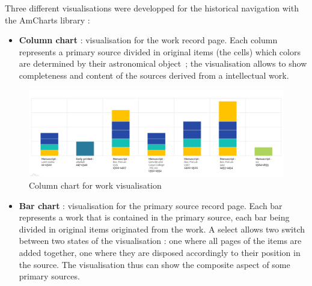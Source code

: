 \documentclass[a4paper,12pt,twoside]{book}
\begin{document}
Three different visualisations were developped for the historical navigation with the AmCharts library :
\begin{itemize}
	\item \textbf{Column chart} : visualisation for the work record page. Each column represents a primary source divided in original items (the cells) which colors are determined by their astronomical object~; the visualisation allows to show completeness and content of the sources derived from a intellectual work.
\end{itemize}

\begin{figure}[H]
	\centering
	\includegraphics[width=16cm]{Images/Visualisations/Work-Tabule_Magne.png}
	\caption{Column chart for work visualisation}
\end{figure}

\begin{itemize}
	\item \textbf\textbf{Bar chart} : visualisation for the primary source record page. Each bar represents a work that is contained in the primary source, each bar being divided in original items originated from the work. A select allows two switch between two states of the visualisation : one where all pages of the items are added together, one where they are disposed accordingly to their position in the source. The visualisation thus can show the composite aspect of some primary sources.
\end{itemize}
\end{document}
